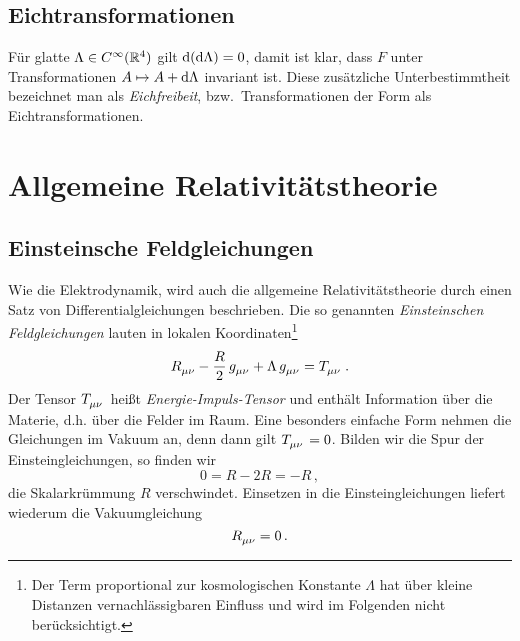 \subsection{Eichtransformationen}
Für glatte $\Lambda\in
C^\infty(\mathbb{R}^4)$ gilt $\dif\,(\dif \Lambda)=0$, damit ist klar, 
dass $F$ unter Transformationen $A\mapsto A+\dif\Lambda$ invariant ist.
Diese zusätzliche Unterbestimmtheit bezeichnet man als \emph{Eichfreibeit},
bzw.\
Transformationen der Form als Eichtransformationen.
\section{Allgemeine Relativitätstheorie}
\subsection{Einsteinsche Feldgleichungen}
Wie die Elektrodynamik, wird auch die allgemeine Relativitätstheorie durch einen
Satz von Differentialgleichungen beschrieben. Die so genannten
\emph{Einsteinschen Feldgleichungen} lauten in lokalen Koordinaten\footnote{Der Term proportional
zur kosmologischen Konstante $\Lambda$ hat über kleine Distanzen vernachlässigbaren Einfluss und wird im Folgenden nicht berücksichtigt.}
\begin{equation}
\tensor{R}{_\mu_\nu} - \frac{R}{2}\, \tensor{g}{_\mu_\nu}
+\Lambda\, \tensor{g}{_\mu_\nu}
=\tensor{T}{_\mu_\nu}\,.
\end{equation}
Der Tensor $\tensor{T}{_\mu_\nu}$ heißt \emph{Energie-Impuls-Tensor} und
enthält Information über die Materie, d.h. über die Felder im Raum. Eine
besonders einfache Form nehmen die Gleichungen im Vakuum an, denn dann gilt
$\tensor{T}{_\mu_\nu}=0$.
Bilden wir die Spur der Einsteingleichungen, so finden wir
\begin{equation}
0=R- 2 R =-R\,,
\end{equation}
die Skalarkrümmung $R$ verschwindet.
Einsetzen in die Einsteingleichungen liefert wiederum die Vakuumgleichung
\begin{equation}
\tensor{R}{_\mu_\nu}=0\,.
\end{equation}
